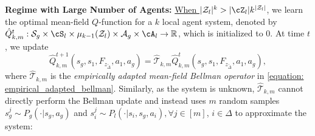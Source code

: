 \documentclass{article}
\newcommand\R{\mathbb{R}}
\theoremstyle{plain}
\theoremstyle{definition}
\def\est{\mathrm{est}}
\def\N{\mathbb{N}}
\DeclareMathOperator*{\argmax}{arg\,max}
\begin{document}
\textbf{Regime with Large Number of Agents:} \underline{When $|\mathcal{Z}_l|^{k}>|\cZ_l|k^{|\mathcal{Z}_l|}$}, we learn the optimal mean-field $Q$-function for a $k$ local agent system, denoted by $\hat{Q}_{k,m}^t:\mathcal{S}_g\times\cS_l\times\mu_{k-1}(\mathcal{Z}_l)\times\mathcal{A}_g\times\cA_l\to\R$, which is initialized to 0. At time $t$, we update \begin{equation}\hat{Q}_{k,m}^{t+1}(s_g,s_1, F_{z_{\tilde{\Delta}}},a_1,a_g)=\hat{\mathcal{T}}_{k,m} \hat{Q}_{k,m}^t(s_g,s_1, F_{z_{\tilde{\Delta}}},a_1,a_g),\end{equation} where $\hat{\mathcal{T}}_{k,m}$ is the \emph{empirically adapted mean-field Bellman operator} in \cref{equation: empirical_adapted_bellman}.
Similarly, as the system is unknown,  $\hat{\mathcal{T}}_{k,m}$ cannot directly perform the Bellman update and instead uses $m$ random samples $s_g^j\sim P_g(\cdot|s_g,a_g)$ and $s_i^j\sim P_l(\cdot|s_i,s_g,a_i), \forall j\in[m]$, $i\in\Delta$ to approximate the system:
\end{document}
